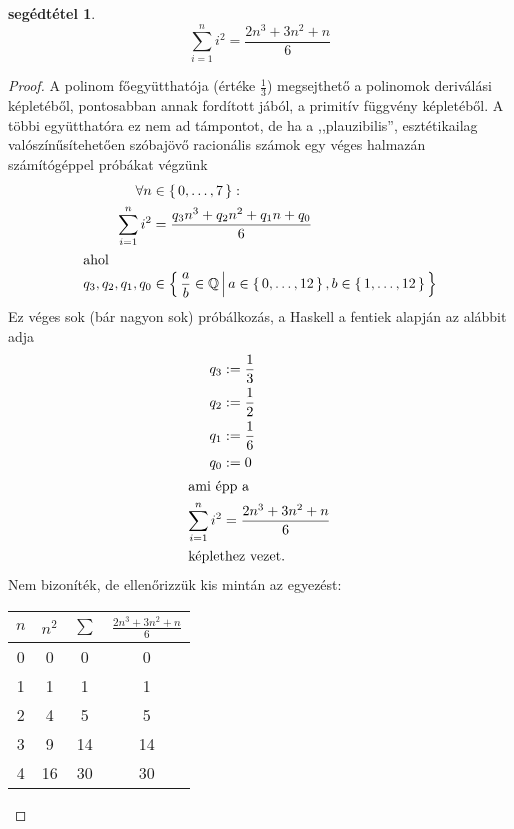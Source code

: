 \documentclass{article}
\newtheorem{lemm}{segédtétel}
\newcommand{\enumOf}[2]{\left\lbrace\,#1,\dots,#2\,\right\rbrace}
\newcommand{\setAbs}[2]{\left\lbrace\,#1\,\middle|\,#2\,\right\rbrace}
\begin{document}
	\begin{lemm}
		\[
			\sum_{i=1}^n i^2 = \frac{2n^3+3n^2+n}6
		\]
	\end{lemm}
	\begin{proof}
		A polinom főegyütthatója (értéke $\frac13$) megsejthető a polinomok deriválási képletéből, pontosabban annak fordított jából, a primitív függvény képletéből.
		A többi együtthatóra ez nem ad támpontot, de ha a ,,plauzibilis'', esztétikailag valószínűsítehetően szóbajövő racionális számok egy véges halmazán számítógéppel próbákat végzünk
		\begin{align}
			\forall n &\in \enumOf07:\\
			\sum_{i=1}^n i^2 &= \frac{q_3n^3+q_2n^2+q_1n+q_0}6\\\intertext{ahol}
			q_3, q_2, q_1, q_0 &\in \setAbs{\frac ab\in\mathbb Q}{a \in \enumOf0{12}, b \in \enumOf1{12}}
		\end{align}
		Ez véges sok (bár nagyon sok) próbálkozás,
		a Haskell a fentiek alapján az alábbit adja
		\begin{align*}
			q_3 &:= \frac13\\
			q_2 &:= \frac12\\
			q_1 &:= \frac16\\
			q_0 &:= 0\\\intertext{ami épp a}
			\sum_{i=1}^n i^2 &= \frac{2n^3+3n^2+n}6\\\intertext{képlethez vezet.}
		\end{align*}
		Nem bizoníték, de ellenőrizzük kis mintán az egyezést:
		\begin{table}[H]
			\begin{tabular}{c|c|c||c}
				$n$	&	$n^2$	&	$\sum$	&	$\frac{2n^3+3n^2+n}6$\\\hline\hline
				0	&	0	&	0	&	0\\\hline
				1	&	1	&	1	&	1\\\hline
				2	&	4	&	5	&	5\\\hline
				3	&	9	&	14	&	14\\\hline
				4	&	16	&	30	&	30
			\end{tabular}
		\end{table}
	\end{proof}
\end{document}
